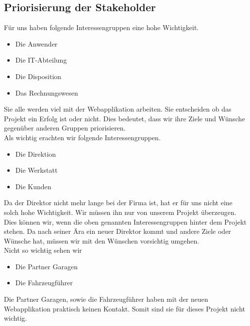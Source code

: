 \subsection{Priorisierung der Stakeholder}
Für uns haben folgende Interessengruppen eine hohe Wichtigkeit.
\begin{itemize}
\item Die Anwender
\item Die IT-Abteilung
\item Die Disposition
\item Das Rechnungswesen
\end{itemize}
%
Sie alle werden viel mit der Webapplikation arbeiten. Sie entscheiden ob das Projekt ein Erfolg ist oder nicht. Dies bedeutet, dass wir ihre Ziele und Wünsche gegenüber anderen Gruppen priorisieren.\\[2ex]
%
Als wichtig erachten wir folgende Interessengruppen.
\begin{itemize}
\item Die Direktion
\item Die Werkstatt
\item Die Kunden
\end{itemize}
%
Da der Direktor nicht mehr lange bei der Firma ist, hat er für uns nicht eine solch hohe Wichtigkeit. Wir müssen ihn nur von unserem Projekt überzeugen. Dies können wir, wenn die oben genannten Interessengruppen hinter dem Projekt stehen. Da nach seiner Ära ein neuer Direktor kommt und andere Ziele oder Wünsche hat, müssen wir mit den Wünschen vorsichtig umgehen.\\[2ex]
%
Nicht so wichtig sehen wir
\begin{itemize}
\item Die Partner Garagen
\item Die Fahrzeugführer
\end{itemize}
%
Die Partner Garagen, sowie die Fahrzeugführer haben mit der neuen Webapplikation praktisch keinen Kontakt. Somit sind sie für dieses Projekt nicht wichtig.
